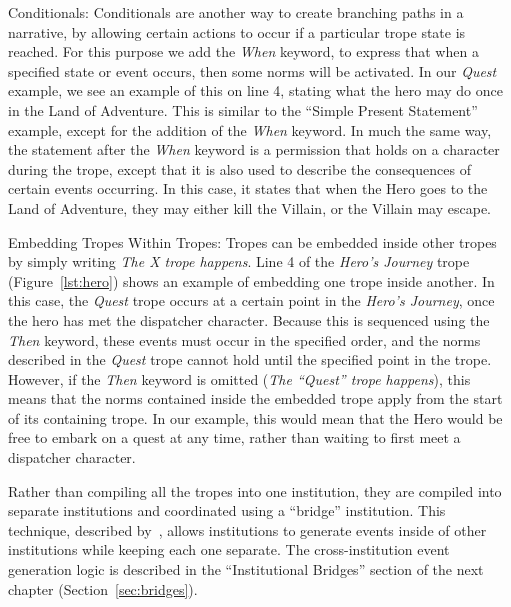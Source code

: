\documentclass[11pt]{report}
\begin{document}
\begin{compactdesc}
\item[Conditionals:]
Conditionals are another way to create branching paths in a narrative, by allowing certain actions to occur if a particular trope state is reached. For this purpose we add the \emph{When} keyword, to express that when a specified state or event occurs, then some norms will be activated. In our \emph{Quest} example, we see an example of this on line 4, stating what the hero may do once in the Land of Adventure. This is similar to the ``Simple Present Statement'' example, except for the addition of the \emph{When} keyword. In much the same way, the statement after the \emph{When} keyword is a permission that holds on a character during the trope, except that it is also used to describe the consequences of certain events occurring. In this case, it states that when the Hero goes to the Land of Adventure, they may either kill the Villain, or the Villain may escape.

\item[Embedding Tropes Within Tropes:]
Tropes can be embedded inside other tropes by simply writing \emph{The X trope happens}.
Line 4 of the \emph{Hero's Journey} trope (Figure~\ref{lst:hero}) shows an example of embedding one trope inside another. In this case, the \emph{Quest} trope occurs at a certain point in the \emph{Hero's Journey}, once the hero has met the dispatcher character. Because this is sequenced using the \emph{Then} keyword, these events must occur in the specified order, and the norms described in the \emph{Quest} trope cannot hold until the specified point in the trope. However, if the \emph{Then} keyword is omitted (\emph{The ``Quest'' trope happens}), this means that the norms contained inside the embedded trope apply from the start of its containing trope. In our example, this would mean that the Hero would be free to embark on a quest at any time, rather than waiting to first meet a dispatcher character.

Rather than compiling all the tropes into one institution, they are compiled
into separate institutions and coordinated using a ``bridge'' institution. This
technique, described by~\citep{bath45254}, allows institutions to generate
events inside of other institutions while keeping each one separate. The
cross-institution event generation logic is described in the ``Institutional Bridges''
section of the next chapter (Section~\ref{sec:bridges}).
\end{compactdesc}
\end{document}
